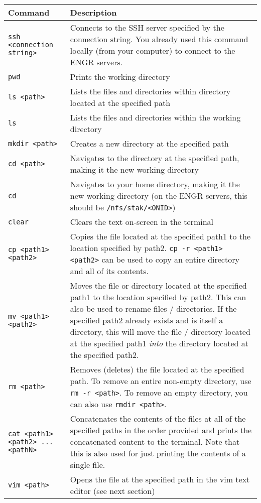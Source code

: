 \documentclass{article}
\begin{document}
\begin{tabular}{|p{}|p{}|}
    \hline
    Command & Description\\
    \hline
    \texttt{ssh <connection string>} & Connects to the SSH server specified by the connection string. You already used this command locally (from your computer) to connect to the ENGR servers.\\
    \hline
    \texttt{pwd} & Prints the working directory\\
    \hline
    \texttt{ls <path>} & Lists the files and directories within directory located at the specified path\\
    \hline
    \texttt{ls} & Lists the files and directories within the working directory\\
    \hline
    \texttt{mkdir <path>} & Creates a new directory at the specified path\\
    \hline
    \texttt{cd <path>} & Navigates to the directory at the specified path, making it the new working directory\\
    \hline
    \texttt{cd} & Navigates to your home directory, making it the new working directory (on the ENGR servers, this should be \texttt{/nfs/stak/<ONID>})\\
    \hline
    \texttt{clear} & Clears the text on-screen in the terminal\\
    \hline
    \texttt{cp <path1> <path2>} & Copies the file located at the specified path1 to the location specified by path2. \texttt{cp -r <path1> <path2>} can be used to copy an entire directory and all of its contents.\\
    \hline
    \texttt{mv <path1> <path2>} & Moves the file or directory located at the specified path1 to the location specified by path2. This can also be used to rename files / directories. If the specified path2 already exists and is itself a directory, this will move the file / directory located at the specified path1 \textit{into} the directory located at the specified path2.\\
    \hline
    \texttt{rm <path>} & Removes (deletes) the file located at the specified path. To remove an entire non-empty directory, use \texttt{rm -r <path>}. To remove an empty directory, you can also use \texttt{rmdir <path>}.\\
    \hline
    \texttt{cat <path1> <path2> ... <pathN>} & Concatenates the contents of the files at all of the specified paths in the order provided and prints the concatenated content to the terminal. Note that this is also used for just printing the contents of a single file.\\
    \hline
    \texttt{vim <path>} & Opens the file at the specified path in the vim text editor (see next section)\\
    \hline
\end{tabular}
\end{document}
